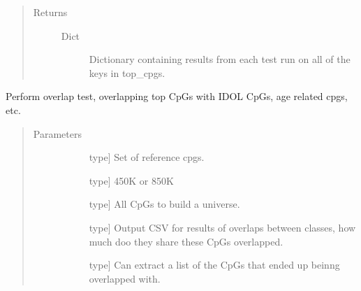 \documentclass[letterpaper,10pt,english]{sphinxmanual}
\begin{document}
\begin{fulllineitems}
\begin{fulllineitems}
\begin{quote}
\begin{description}
\begin{description}
\end{description}

\item[{Returns}] \leavevmode\begin{description}
\item[{Dict}] \leavevmode
Dictionary containing results from each test run on all of the keys in top\_cpgs.

\end{description}

\end{description}\end{quote}

\end{fulllineitems}


\begin{fulllineitems}
\label{\detokenize{index:methylnet.interpretation_classes.BioInterpreter.return_overlap_score}}
Perform overlap test, overlapping top CpGs with IDOL CpGs, age related cpgs, etc.
\begin{quote}\begin{description}
\item[{Parameters}] \leavevmode\begin{description}
\item[{}] \leavevmode{[}type{]}
Set of reference cpgs.

\item[{}] \leavevmode{[}type{]}
450K or 850K

\item[{}] \leavevmode{[}type{]}
All CpGs to build a universe.

\item[{}] \leavevmode{[}type{]}
Output CSV for results of overlaps between classes, how much doo they share these CpGs overlapped.

\item[{}] \leavevmode{[}type{]}
Can extract a list of the CpGs that ended up beinng overlapped with.


\end{description}
\end{description}
\end{quote}
\end{fulllineitems}
\end{fulllineitems}
\end{document}
